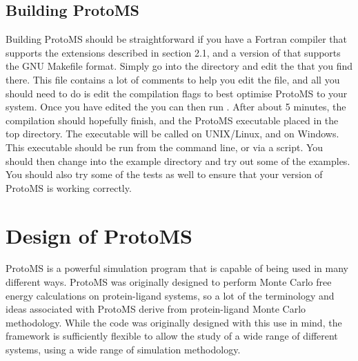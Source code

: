 \documentclass[letterpaper,10pt,english]{sphinxmanual}
\begin{document}
\section{Building ProtoMS}
\label{compilation:building-protoms}
Building ProtoMS should be straightforward if you have a Fortran compiler that supports the extensions described in section 2.1, and a version of  that supports the GNU Makefile format. Simply go into the  directory and edit the  that you find there. This file contains a lot of comments to help you edit the file, and all you should need to do is edit the compilation flags to best optimise ProtoMS to your system. Once you have edited the  you can then run . After about 5 minutes, the compilation should hopefully finish, and the ProtoMS executable placed in the top directory. The executable will be called  on UNIX/Linux, and  on Windows. This executable should be run from the command line, or via a script. You should then change into the example directory and try out some of the examples. You should also try some of the tests as well to ensure that your version of ProtoMS is working correctly.


\chapter{Design of ProtoMS}
\label{protoms:design-of-protoms}\label{protoms::doc}
ProtoMS is a powerful simulation program that is capable of being used in many different ways. ProtoMS was originally designed to perform Monte Carlo free energy calculations on protein-ligand systems, so a lot of the terminology and ideas associated with ProtoMS derive from protein-ligand Monte Carlo methodology. While the code was originally designed with this use in mind, the framework is sufficiently flexible to allow the study of a wide range of different systems, using a wide range of simulation methodology.
\end{document}
